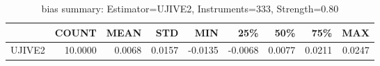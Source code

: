 \begin{table}[ht]
\centering
\caption{bias summary: Estimator=UJIVE2, Instruments=333, Strength=0.80}
\begin{tabular}{lrrrrrrrr}
\toprule
 & COUNT & MEAN & STD & MIN & 25\% & 50\% & 75\% & MAX \\
\midrule
UJIVE2 & 10.0000 & 0.0068 & 0.0157 & -0.0135 & -0.0068 & 0.0077 & 0.0211 & 0.0247 \\
\bottomrule
\end{tabular}
\end{table}
